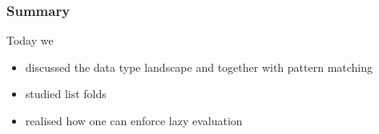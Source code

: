 \documentclass[10pt,pdf,utf8,russian,aspectratio=169]{beamer}
\begin{document}
\begin{frame}
  \frametitle{Summary}

  Today we
  \begin{itemize}
    \item discussed the data type landscape and together with pattern matching
    \item studied list folds
    \item realised how one can enforce lazy evaluation
  \end{itemize}

\end{frame}
\end{document}
